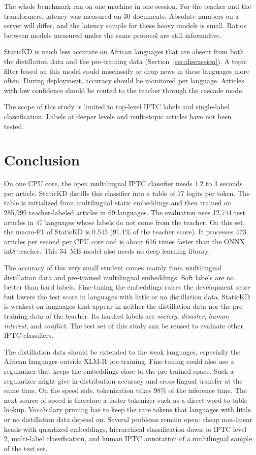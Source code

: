 \documentclass[journal]{IEEEtran}
\begin{document}
The whole benchmark ran on one machine in one session. For the teacher and the transformers, latency was measured on 30 documents. Absolute numbers on a server will differ, and the latency sample for these heavy models is small. Ratios between models measured under the same protocol are still informative.

StaticKD is much less accurate on African languages that are absent from both the distillation data and the pre-training data (Section~\ref{sec:discussion}). A topic filter based on this model could misclassify or drop news in these languages more often. During deployment, accuracy should be monitored per language. Articles with low confidence should be routed to the teacher through the cascade mode.

The scope of this study is limited to top-level IPTC labels and single-label classification. Labels at deeper levels and multi-topic articles have not been tested.

\section{Conclusion}
\label{sec:conclusion}
On one CPU core, the open multilingual IPTC classifier needs 1.2 to 3 seconds per article. StaticKD distills this classifier into a table of 17 logits per token. The table is initialized from multilingual static embeddings and then trained on 285,999 teacher-labeled articles in 69 languages. The evaluation uses 12,744 test articles in 47 languages whose labels do not come from the teacher. On this set, the macro-F1 of StaticKD is 0.545 (91.1\% of the teacher score). It processes 473 articles per second per CPU core and is about 616 times faster than the ONNX int8 teacher. This 34~MB model also needs no deep learning library.

The accuracy of this very small student comes mainly from multilingual distillation data and pre-trained multilingual embeddings. Soft labels are no better than hard labels. Fine-tuning the embeddings raises the development score but lowers the test score in languages with little or no distillation data. StaticKD is weakest on languages that appear in neither the distillation data nor the pre-training data of the teacher. Its hardest labels are \emph{society}, \emph{disaster}, \emph{human interest}, and \emph{conflict}. The test set of this study can be reused to evaluate other IPTC classifiers.

The distillation data should be extended to the weak languages, especially the African languages outside XLM-R pre-training. Fine-tuning could also use a regularizer that keeps the embeddings close to the pre-trained space. Such a regularizer might give in-distribution accuracy and cross-lingual transfer at the same time. On the speed side, tokenization takes 98\% of the inference time. The next source of speed is therefore a faster tokenizer such as a direct word-to-table lookup. Vocabulary pruning has to keep the rare tokens that languages with little or no distillation data depend on. Several problems remain open: cheap non-linear heads with quantized embeddings, hierarchical classification down to IPTC level 2, multi-label classification, and human IPTC annotation of a multilingual sample of the test set.
\end{document}
